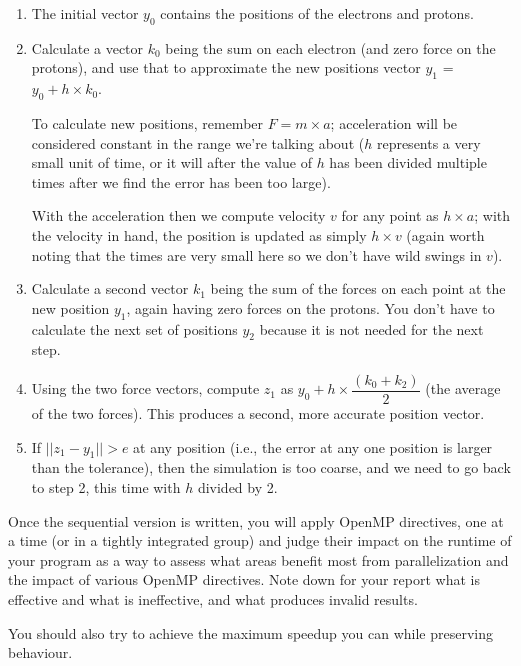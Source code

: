 \documentclass[letterpaper,10pt]{article}
\begin{document}
\begin{enumerate}
\item The initial vector $y_{0}$ contains the positions of the electrons and protons.

\item Calculate a vector $k_{0}$ being the sum on each electron (and zero force on the protons), and use that to approximate the new positions vector $y_{1}$ = $y_{0} + h \times k_{0}$.

To calculate new positions, remember $F = m \times a$;  acceleration will be considered constant in the range we're talking about ($h$ represents a very small unit of time, or it will after the value of $h$ has been divided multiple times after we find the error has been too large). 

With the acceleration then we compute velocity $v$ for any point as $h \times a$; with the velocity in hand, the position is updated as simply $h \times v$ (again worth noting that the times are very small here so we don't have wild swings in $v$). 

\item Calculate a second vector $k_{1}$ being the sum of the forces on each point at the new position $y_{1}$, again having zero forces on the protons. You don't have to calculate the next set of positions $y_{2}$ because it is not needed for the next step.

\item Using the two force vectors,  compute $z_{1}$ as $y_{0} + h \times \dfrac{( k_{0} + k_{2} )}{2}$ (the average of the two forces). This produces a second, more accurate position vector.

\item If $||z_{1} - y_{1}|| > e$ at any position (i.e., the error at any one position is larger than the tolerance), then the simulation is too coarse, and we need to go back to step 2, this time with $h$ divided by 2.

\end{enumerate}

Once the sequential version is written, you will apply OpenMP directives, one at a time (or in a tightly integrated group) and judge their impact on the runtime of your program as a way to assess what areas benefit most from parallelization and the impact of various OpenMP directives. Note down for your report what is effective and what is ineffective, and what produces invalid results. 

You should also try to achieve the maximum speedup you can while preserving behaviour. 
\end{document}
